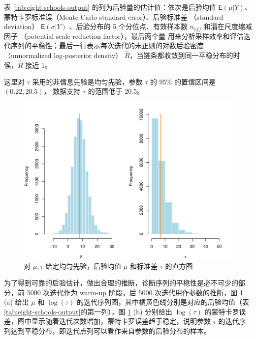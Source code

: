 \documentclass[12pt,a4paper,UTF8,twoside]{book}
\theoremstyle{definition}
\theoremstyle{definition}
\theoremstyle{definition}
\theoremstyle{remark}
\begin{document}
表 \ref{tab:eight-schools-output} 的列为后验量的估计值：依次是后验均值
\(\mathsf{E}(\mu|Y)\)、 蒙特卡罗标准误（Monte Carlo standard
error）、后验标准差 （standard deviation） \(\mathsf{E}(\sigma|Y)\)
、后验分布的 5 个分位点、有效样本数 \(n_{eff}\) 和潜在尺度缩减因子
（potential scale reduction factor），最后两个量
用来分析采样效率和评估迭代序列的平稳性；最后一行表示每次迭代的未正则的对数后验密度
（unnormalized log-posterior density）
\(\hat{R}\)，当链条都收敛到同一平稳分布的时候，\(\hat{R}\) 接近 1。

这里对 \(\tau\) 采用的非信息先验是均匀先验，参数 \(\tau\) 的 95\%
的置信区间是 \((0.22,20.5)\)， 数据支持 \(\tau\) 的范围低于 20.5。

\begin{figure}

{\centering \includegraphics[width=0.7\linewidth]{figures/posterior_mu_tau} 

}

\caption{对 $\mu,\tau$ 给定均匀先验，后验均值 $\mu$ 和标准差 $\tau$ 的直方图}\label{fig:posterior-mu-tau}
\end{figure}

为了得到可靠的后验估计，做出合理的推断，诊断序列的平稳性是必不可少的部分，前
5000 次迭代作为 warm-up 阶段，后 5000 次迭代用作参数的推断，图
\ref{fig:posterior-mu-tau} (a) 给出 \(\mu\) 和 \(\log(\tau)\)
的迭代序列图，其中橘黄色线分别是对应的后验均值（表
\ref{tab:eight-schools-output}的第一列），图 \ref{fig:posterior-mu-tau}
(b) 分别给出 \(\log(\tau)\)
的蒙特卡罗误差，图中显示随着迭代次数增加，蒙特卡罗误差趋于稳定，说明参数
\(\tau\)
的迭代序列达到平稳分布，即迭代点列可以看作来自参数的后验分布的样本。
\end{document}
